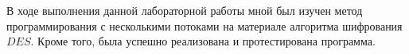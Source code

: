 \Conclusion %

В ходе выполнения данной лабораторной работы мной был изучен метод программирования с несколькими потоками на материале алгоритма шифрования $DES$. Кроме того, была успешно реализована и протестирована программа.

